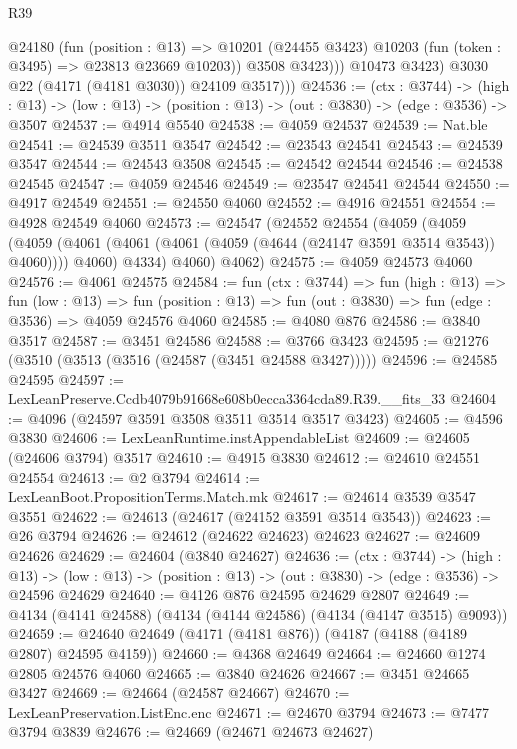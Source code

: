 \begin{lexlean}{R39}
\begin{coremodule}
                @24180
                  (fun (position : @13) =>
                  @10201 (@24455 @3423) @10203 (fun (token : @3495) => @23813 @23669 @10203))
                  @3508
                  @3423)))
            @10473
            @3423)
          @3030
          @22
          (@4171 (@4181 @3030))
          @24109
          @3517)))
@24536 := (ctx : @3744) ->
  (high : @13) -> (low : @13) -> (position : @13) -> (out : @3830) -> (edge : @3536) -> @3507
@24537 := @4914 @5540
@24538 := @4059 @24537
@24539 := Nat.ble
@24541 := @24539 @3511 @3547
@24542 := @23543 @24541
@24543 := @24539 @3547
@24544 := @24543 @3508
@24545 := @24542 @24544
@24546 := @24538 @24545
@24547 := @4059 @24546
@24549 := @23547 @24541 @24544
@24550 := @4917 @24549
@24551 := @24550 @4060
@24552 := @4916 @24551
@24554 := @4928 @24549 @4060
@24573 := @24547
    (@24552
      @24554
      (@4059
        (@4059
          (@4059 (@4061 (@4061 (@4061 (@4059 (@4644 (@24147 @3591 @3514 @3543)) @4060)))) @4060)
          @4334)
        @4060)
      @4062)
@24575 := @4059 @24573 @4060
@24576 := @4061 @24575
@24584 := fun (ctx : @3744) =>
  fun (high : @13) =>
  fun (low : @13) =>
  fun (position : @13) => fun (out : @3830) => fun (edge : @3536) => @4059 @24576 @4060
@24585 := @4080 @876
@24586 := @3840 @3517
@24587 := @3451 @24586
@24588 := @3766 @3423
@24595 := @21276 (@3510 (@3513 (@3516 (@24587 (@3451 @24588 @3427)))))
@24596 := @24585 @24595
@24597 := LexLeanPreserve.Ccdb4079b91668e608b0ecca3364cda89.R39.__fits_33
@24604 := @4096 (@24597 @3591 @3508 @3511 @3514 @3517 @3423)
@24605 := @4596 @3830
@24606 := LexLeanRuntime.instAppendableList
@24609 := @24605 (@24606 @3794) @3517
@24610 := @4915 @3830
@24612 := @24610 @24551 @24554
@24613 := @2 @3794
@24614 := LexLeanBoot.PropositionTerms.Match.mk
@24617 := @24614 @3539 @3547 @3551
@24622 := @24613 (@24617 (@24152 @3591 @3514 @3543))
@24623 := @26 @3794
@24626 := @24612 (@24622 @24623) @24623
@24627 := @24609 @24626
@24629 := @24604 (@3840 @24627)
@24636 := (ctx : @3744) ->
  (high : @13) ->
  (low : @13) -> (position : @13) -> (out : @3830) -> (edge : @3536) -> @24596 @24629
@24640 := @4126 @876 @24595 @24629 @2807
@24649 := @4134 (@4141 @24588) (@4134 (@4144 @24586) (@4134 (@4147 @3515) @9093))
@24659 := @24640 @24649 (@4171 (@4181 @876)) (@4187 (@4188 (@4189 @2807) @24595 @4159))
@24660 := @4368 @24649
@24664 := @24660 @1274 @2805 @24576 @4060
@24665 := @3840 @24626
@24667 := @3451 @24665 @3427
@24669 := @24664 (@24587 @24667)
@24670 := LexLeanPreservation.ListEnc.enc
@24671 := @24670 @3794
@24673 := @7477 @3794 @3839
@24676 := @24669 (@24671 @24673 @24627)

\end{coremodule}
\end{lexlean}
